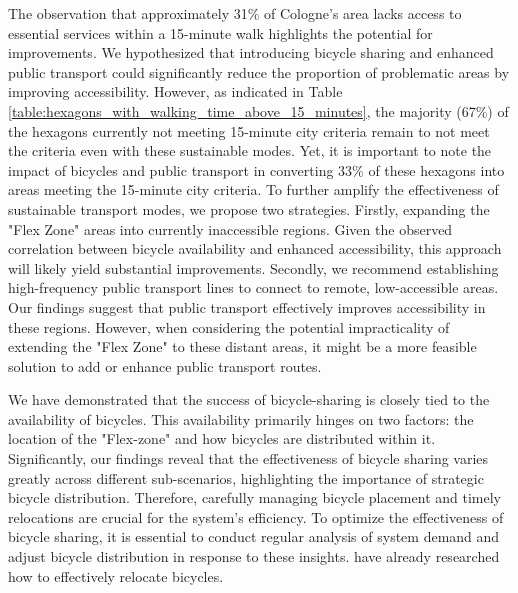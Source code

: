 The observation that approximately 31\% of Cologne's area lacks access to essential services within a 15-minute walk highlights the potential for improvements.
We hypothesized that introducing bicycle sharing and enhanced public transport could significantly reduce the proportion of problematic areas by improving accessibility.
However, as indicated in Table \ref{table:hexagons_with_walking_time_above_15_minutes}, the majority (67\%) of the hexagons currently not meeting 15-minute city criteria remain to not meet the criteria even with these sustainable modes.
Yet, it is important to note the impact of bicycles and public transport in converting 33\% of these hexagons into areas meeting the 15-minute city criteria.
To further amplify the effectiveness of sustainable transport modes, we propose two strategies.
Firstly, expanding the "Flex Zone" areas into currently inaccessible regions. 
Given the observed correlation between bicycle availability and enhanced accessibility, this approach will likely yield substantial improvements.
Secondly, we recommend establishing high-frequency public transport lines to connect to remote, low-accessible areas. 
Our findings suggest that public transport effectively improves accessibility in these regions. 
However, when considering the potential impracticality of extending the "Flex Zone" to these distant areas, it might be a more feasible solution to add or enhance public transport routes.

We have demonstrated that the success of bicycle-sharing is closely tied to the availability of bicycles.
This availability primarily hinges on two factors: the location of the "Flex-zone" and how bicycles are distributed within it.
Significantly, our findings reveal that the effectiveness of bicycle sharing varies greatly across different sub-scenarios, highlighting the importance of strategic bicycle distribution.
Therefore, carefully managing bicycle placement and timely relocations are crucial for the system's efficiency.
To optimize the effectiveness of bicycle sharing, it is essential to conduct regular analysis of system demand and adjust bicycle distribution in response to these insights.
 have already researched how to effectively relocate bicycles.



